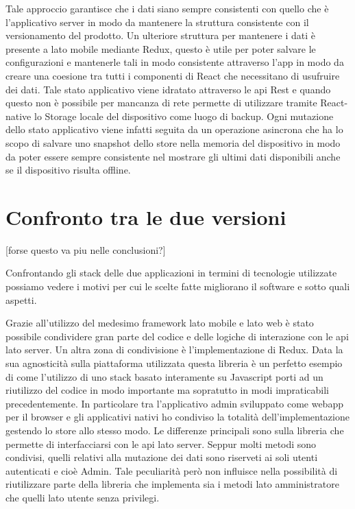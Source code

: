 Tale approccio garantisce che i dati siano sempre consistenti con quello che è l'applicativo server in modo da mantenere la struttura consistente con il versionamento del prodotto. Un ulteriore struttura per mantenere i dati è presente a lato mobile mediante Redux, questo è utile per poter salvare le configurazioni e mantenerle tali in modo consistente attraverso l'app in modo da creare una coesione tra tutti i componenti di React che necessitano di usufruire dei dati. Tale stato applicativo viene idratato attraverso le api Rest e quando questo non è possibile per mancanza di rete permette di utilizzare tramite React-native lo Storage locale del dispositivo come luogo di backup. Ogni mutazione dello stato applicativo viene infatti seguita da un operazione asincrona che ha lo scopo di salvare uno snapshot dello store nella memoria del dispositivo in modo da poter essere sempre consistente nel mostrare gli ultimi dati disponibili anche se il dispositivo risulta offline.\vspace{5mm}

\section{Confronto tra le due versioni}\vspace{5mm}  
[forse questo va piu nelle conclusioni?]

Confrontando gli stack delle due applicazioni in termini di tecnologie utilizzate possiamo vedere i motivi per cui le scelte fatte migliorano il software e sotto quali aspetti. \vspace{5mm}

Grazie all'utilizzo del medesimo framework lato mobile e lato web è stato possibile condividere gran parte del codice e delle logiche di interazione con le api lato server. Un altra zona di condivisione è l'implementazione di Redux. Data la sua agnosticità sulla piattaforma utilizzata questa libreria è un perfetto esempio di come l'utilizzo di uno stack basato interamente su Javascript porti ad un riutilizzo del codice in modo importante ma sopratutto in modi impraticabili precedentemente. In particolare tra l’applicativo admin sviluppato come webapp per il browser e gli applicativi nativi ho condiviso la totalità dell’implementazione gestendo lo store allo stesso modo. Le differenze principali sono sulla libreria che permette di interfacciarsi con le api lato server. Seppur molti metodi sono condivisi, quelli relativi alla mutazione dei dati sono riserveti ai soli utenti autenticati e cioè Admin. Tale peculiarità però non influisce nella possibilità di riutilizzare parte della libreria che implementa sia i metodi lato amministratore che quelli lato utente senza privilegi.\vspace{5mm} 

